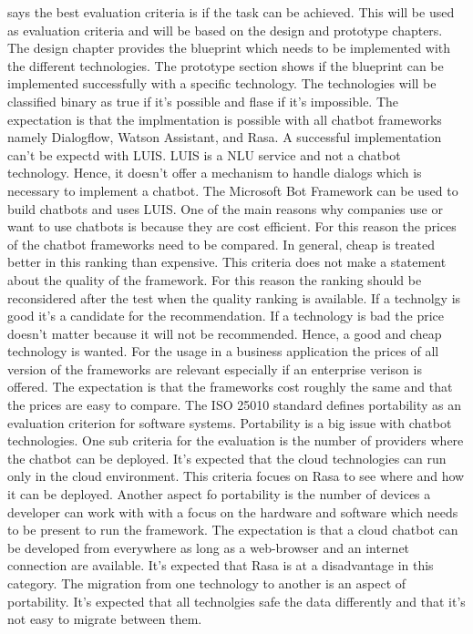 \citet{singhbuilding} says the best evaluation criteria is if the 
task can be achieved.
This will be used as evaluation criteria and will be based on the 
design and prototype chapters.
The design chapter provides the blueprint which needs to be 
implemented with the different technologies.
The prototype section shows if the blueprint can be 
implemented successfully with a specific technology.
The technologies will be classified binary as true if it's possible and 
flase if it's impossible.
The expectation is that the implmentation is possible with 
all chatbot frameworks namely Dialogflow, Watson Assistant, and Rasa.
A successful implementation can't be expectd with LUIS.
LUIS is a NLU service and not a chatbot technology.
Hence, it doesn't offer a mechanism to handle dialogs which is 
necessary to implement a chatbot.
The Microsoft Bot Framework can be used to build chatbots 
and uses LUIS.
One of the main reasons why companies use or want to use chatbots is because they are cost efficient.
For this reason the prices of the chatbot frameworks need to be compared.
In general, cheap is treated better in this ranking than expensive.
This criteria does not make a statement about the quality of the framework.
For this reason the ranking should be reconsidered after the test when the 
quality ranking is available.
If a technolgy is good it's a candidate for the recommendation.
If a technology is bad the price doesn't matter because it will not be recommended.
Hence, a good and cheap technology is wanted. 
For the usage in a business application the prices of all version of the frameworks are relevant 
especially if an enterprise verison is offered.
The expectation is that the frameworks cost roughly the same and that 
the prices are easy to compare.
The ISO 25010\cite{iso25010} standard defines portability as an evaluation criterion for software systems.
Portability is a big issue with chatbot technologies.
One sub criteria for the evaluation is the number of providers where the chatbot 
can be deployed.
It's expected that the cloud technologies can run only in the cloud environment.
This criteria focues on Rasa to see where and how it can be deployed.
Another aspect fo portability is the number of devices a developer can work with 
with a focus on the hardware and software which needs to be present to run the 
framework.
The expectation is that a cloud chatbot can be developed from everywhere 
as long as a web-browser and an internet connection are available.
It's expected that Rasa is at a disadvantage in this category.
The migration from one technology to another is an aspect of portability.
It's expected that all technolgies safe the data differently and that it's not 
easy to migrate between them.


